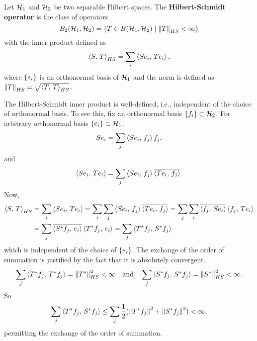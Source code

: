 \begin{definition}
    Let $\mathcal{H}_1$ and $\mathcal{H}_2$ be two separable Hilbert spaces. 
    The \textbf{Hilbert-Schmidt operator} is the class of operators 
    \begin{equation*}
        B_2(\mathcal{H}_1,\mathcal{H}_2) = \left\{ T\in B(\mathcal{H}_1,\mathcal{H}_2) \;\middle\vert\; \left\lVert {T} \right\rVert_{HS}<\infty \right\}
    \end{equation*}
    with the inner product defined as 
    \begin{equation*}
        \left\langle {S},\, {T} \right\rangle_{HS} = \sum_i \left\langle {Se_i},\, {Te_i} \right\rangle, 
    \end{equation*}
    where $\left\{ {e_i} \right\}$ is an orthonormal basis of $\mathcal{H}_1$ and the norm 
    is defined as $\left\lVert {T} \right\rVert_{HS} = \sqrt{\left\langle {T},\, {T} \right\rangle_{HS}}$.
\end{definition}
\begin{remark}
    The Hilbert-Schmidt inner product is well-defined, i.e., independent 
    of the choice of orthonormal basis. To see this, fix an orthonormal 
    basis $\left\{ {f_i} \right\}\subset\mathcal{H}_2$. For arbitrary orthonormal basis 
    $\left\{ {e_i} \right\}\subset\mathcal{H}_1$, 
    \begin{equation*}
        Se_i = \sum_j \left\langle {Se_i},\, {f_j} \right\rangle f_j,
    \end{equation*}
    and 
    \begin{equation*}
        \left\langle {Se_i},\, {Te_i} \right\rangle = \sum_j \left\langle {Se_i},\, {f_j} \right\rangle\overline{\left\langle {Te_i},\, {f_j} \right\rangle}.
    \end{equation*}
    Now, 
    \begin{equation*}
        \begin{split}
            \left\langle {S},\, {T} \right\rangle_{HS} &= \sum_i \left\langle {Se_i},\, {Te_i} \right\rangle 
            = \sum_i \sum_j \left\langle {Se_i},\, {f_j} \right\rangle\overline{\left\langle {Te_i},\, {f_j} \right\rangle} 
            = \sum_j \sum_i \overline{\left\langle {f_j},\, {Se_i} \right\rangle}\left\langle {f_j},\, {Te_i} \right\rangle \\ 
            &= \sum_j \overline{\left\langle {S^*f_j},\, {e_i} \right\rangle}\left\langle {T^*f_j},\, {e_i} \right\rangle 
            = \sum_j \left\langle {T^*f_j},\, {S^*f_j} \right\rangle
        \end{split}
    \end{equation*}
    which is independent of the choice of $\left\{ {e_i} \right\}$. The exchange 
    of the order of summation is justified by the fact that it is 
    absolutely convergent. 
    \begin{equation*}
        \sum_j \left\langle {T^*f_j},\, {T^*f_j} \right\rangle = \left\lVert {T^*} \right\rVert^2_{HS} < \infty 
        \quad\text{and}\quad \sum_j \left\langle {S^*f_j},\, {S^*f_j} \right\rangle = \left\lVert {S^*} \right\rVert^2_{HS} < \infty.
    \end{equation*}
    So 
    \begin{equation*}
        \sum_j \left\langle {T^*f_j},\, {S^*f_j} \right\rangle \leq \sum_j \frac{1}{2}(\left\lVert {T^*f_j} \right\rVert^2 + \left\lVert {S^*f_j} \right\rVert^2) < \infty,
    \end{equation*}
    permitting the exchange of the order of summation.
\end{remark}

